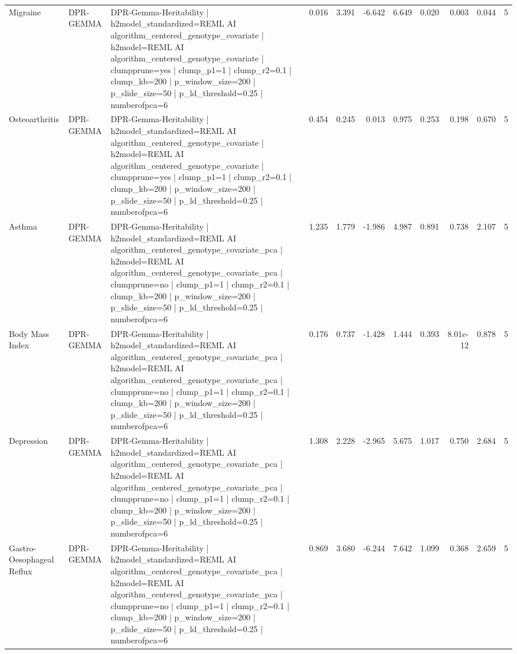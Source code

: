 \begin{landscape}
\begin{longtable}{p{2.4cm}p{1.8cm}p{6.0cm}rrrrrrrr}
Migraine & DPR-GEMMA & DPR-Gemma-Heritability | h2model\_standardized=REML AI algorithm\_centered\_genotype\_covariate | h2model=REML AI algorithm\_centered\_genotype\_covariate | clumpprune=yes | clump\_p1=1 | clump\_r2=0.1 | clump\_kb=200 | p\_window\_size=200 | p\_slide\_size=50 | p\_ld\_threshold=0.25 | numberofpca=6 & 0.016 & 3.391 & -6.642 & 6.649 & 0.020 & 0.003 & 0.044 & 5 \\
Osteoarthritis & DPR-GEMMA & DPR-Gemma-Heritability | h2model\_standardized=REML AI algorithm\_centered\_genotype\_covariate | h2model=REML AI algorithm\_centered\_genotype\_covariate | clumpprune=yes | clump\_p1=1 | clump\_r2=0.1 | clump\_kb=200 | p\_window\_size=200 | p\_slide\_size=50 | p\_ld\_threshold=0.25 | numberofpca=6 & 0.454 & 0.245 & 0.013 & 0.975 & 0.253 & 0.198 & 0.670 & 5 \\
Asthma & DPR-GEMMA & DPR-Gemma-Heritability | h2model\_standardized=REML AI algorithm\_centered\_genotype\_covariate\_pca | h2model=REML AI algorithm\_centered\_genotype\_covariate\_pca | clumpprune=no | clump\_p1=1 | clump\_r2=0.1 | clump\_kb=200 | p\_window\_size=200 | p\_slide\_size=50 | p\_ld\_threshold=0.25 | numberofpca=6 & 1.235 & 1.779 & -1.986 & 4.987 & 0.891 & 0.738 & 2.107 & 5 \\
Body Mass Index & DPR-GEMMA & DPR-Gemma-Heritability | h2model\_standardized=REML AI algorithm\_centered\_genotype\_covariate\_pca | h2model=REML AI algorithm\_centered\_genotype\_covariate\_pca | clumpprune=no | clump\_p1=1 | clump\_r2=0.1 | clump\_kb=200 | p\_window\_size=200 | p\_slide\_size=50 | p\_ld\_threshold=0.25 | numberofpca=6 & 0.176 & 0.737 & -1.428 & 1.444 & 0.393 & 8.01e-12 & 0.878 & 5 \\
Depression & DPR-GEMMA & DPR-Gemma-Heritability | h2model\_standardized=REML AI algorithm\_centered\_genotype\_covariate\_pca | h2model=REML AI algorithm\_centered\_genotype\_covariate\_pca | clumpprune=no | clump\_p1=1 | clump\_r2=0.1 | clump\_kb=200 | p\_window\_size=200 | p\_slide\_size=50 | p\_ld\_threshold=0.25 | numberofpca=6 & 1.308 & 2.228 & -2.965 & 5.675 & 1.017 & 0.750 & 2.684 & 5 \\
Gastro-Oesophageal Reflux & DPR-GEMMA & DPR-Gemma-Heritability | h2model\_standardized=REML AI algorithm\_centered\_genotype\_covariate\_pca | h2model=REML AI algorithm\_centered\_genotype\_covariate\_pca | clumpprune=no | clump\_p1=1 | clump\_r2=0.1 | clump\_kb=200 | p\_window\_size=200 | p\_slide\_size=50 | p\_ld\_threshold=0.25 | numberofpca=6 & 0.869 & 3.680 & -6.244 & 7.642 & 1.099 & 0.368 & 2.659 & 5 \\

\end{longtable}
\end{landscape}
